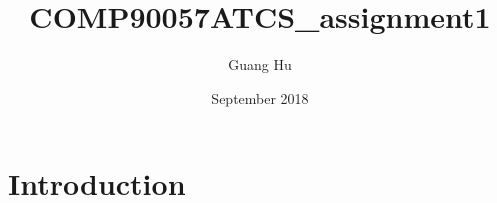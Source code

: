 \documentclass{article}
\title{COMP90057ATCS\_assignment1}
\author{Guang Hu }
\date{September 2018}
\begin{document}
\maketitle

\section{Introduction}
\end{document}
